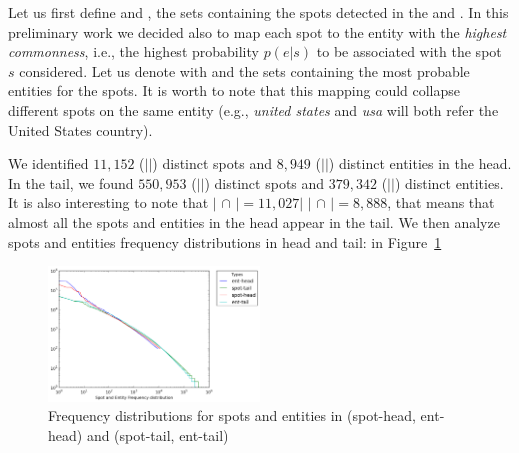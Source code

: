 Let us first define \shead{} and \stail{}, the sets containing the spots detected in the 
\head{} and \tail{}. In this preliminary work we decided also to map each spot 
to the entity with the \emph{highest commonness}, i.e., the highest probability $p(e|s)$
to be associated with the spot $s$ considered. Let us denote with \ehead{} and \etail{}
the sets containing the most probable entities for the spots. It is worth to note
that this mapping could collapse different spots on the same entity (e.g., \emph{united states} and 
\emph{usa} will both refer the United States country). 

We identified $11,152$ ($|$\shead{}$|$)  distinct spots and $8,949$ ($|$\ehead{}$|$) distinct 
entities in the head. In the tail, we found $550,953$ ($|$\stail{}$|$) distinct spots and 
$379,342$ ($|$\etail{}$|$) distinct entities. It  is also interesting to note that 
$|$  \shead{} $\cap$ \stail{} $| = 11,027 |$  $|$ \ehead{} $\cap$ \etail{} $| = 8,888$, that 
means that almost all the spots and entities in the head appear in the tail. 
We then analyze spots and entities frequency distributions in head and tail: 
in Figure~\ref{img:distributions}

\begin{figure}[t]

  \centering
    \includegraphics[width = 0.5\textwidth]{images/head-tail-ent-spot-dist.png}
	\caption{Frequency distributions for spots and entities in \head{} (spot-head, ent-head) and \tail{} (spot-tail, ent-tail)}
\label{img:distributions}
\end{figure}





